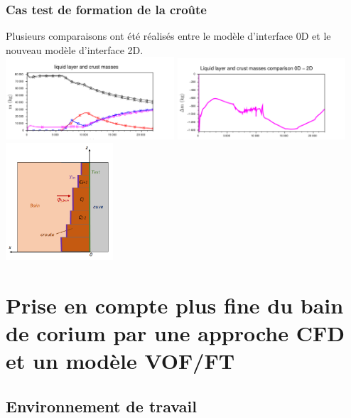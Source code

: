 \documentclass{beamer}
\begin{document}
\begin{frame}[t,noframenumbering]
    \frametitle{Cas test de formation de la croûte}
\footnotesize
    Plusieurs comparaisons ont été réalisés entre le modèle d'interface 0D et le nouveau modèle d'interface 2D.\\
   \includegraphics[width=0.47\textwidth]{Figures/IndustrialTestmasses2.pdf}
    \includegraphics[width=0.47\textwidth]{Figures/IndustrialTestdiffMasses2.pdf}\\
     \center \includegraphics[width=0.3\textwidth]{Figures/modele_croute_0D.png}
    
    
\end{frame}

\section{Prise en compte plus fine du bain de corium par une approche CFD et un modèle VOF/FT}
\subsection{Environnement de travail}
\end{document}
